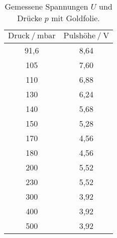 \begin{table}[H]
   \centering
   \caption{Gemessene Spannungen $U$ und Drücke $p$ mit Goldfolie.}
   \label{tab:mit}
   \begin{tabular} { c c }
 \toprule
 {$\text{Druck}\:/\: \mathrm{mbar}$} & {$\text{Pulshöhe}\:/\: \mathrm{V}$} \\ 
    \midrule
    91,6 & 8,64 \\
    105 & 7,60 \\
    110 & 6,88 \\
    130 & 6,24 \\
    140 & 5,68 \\
    150 & 5,28 \\
    170 & 4,56 \\
    180 & 4,56 \\
    200 & 5,52 \\
    230 & 5,52 \\
    300 & 3,92 \\
    400 & 3,92 \\
    500 & 3,92 \\
    \bottomrule
  \end{tabular}
\end{table}
